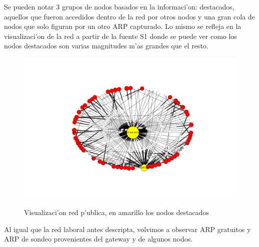Se pueden notar 3 grupos de nodos basados en la informaci'on: destacados, aquellos que fueron accedidos dentro de la red por otros nodos y una
gran cola de nodos que solo figuran por un otro ARP capturado. Lo mismo se refleja en la visualizaci'on de la red a partir de la fuente S1
donde se puede ver como los nodos destacados son varias magnitudes m'as grandes que el resto. 

\begin{figure}[!h]
\caption{Visualizaci'on red p'ublica, en amarillo los nodos destacados}
\includegraphics[width=1.1\textwidth]{red3_red}
 \label{fig:red3net}
\end{figure}

Al igual que la red laboral antes descripta, volvimos a observar ARP gratuitos y ARP de sondeo provenientes del gateway y de algunos nodos.
